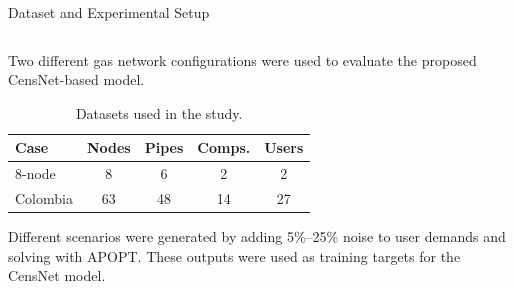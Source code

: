 \documentclass[hyperref={colorlinks,citecolor=blue,linkcolor=blue,urlcolor=blue}]{beamer}
\begin{document}
\begin{frame}{Dataset and Experimental Setup}
\scriptsize
\begin{columns}[t,onlytextwidth]
    \begin{column}{0.55\textwidth}
        Two different gas network configurations were used to evaluate the proposed CensNet-based model.

        \vspace{0.3em}
        \begin{table}[H]
            \centering
            \setlength{\tabcolsep}{4pt}
            \renewcommand{\arraystretch}{1.1}
            \caption{\scriptsize Datasets used in the study.}
            \begin{tabular}{lcccc}
                \toprule
                \textbf{Case} & \textbf{Nodes} & \textbf{Pipes} & \textbf{Comps.} & \textbf{Users} \\
                \midrule
                8-node & 8  & 6  & 2  & 2  \\
                Colombia & 63 & 48 & 14 & 27 \\
                \bottomrule
            \end{tabular}
        \end{table}

        \vspace{0.5em}
        Different scenarios were generated by adding 5\%–25\% noise to user demands and solving with APOPT.
        These outputs were used as training targets for the CensNet model.
    \end{column}


\end{columns}
\end{frame}
\end{document}

